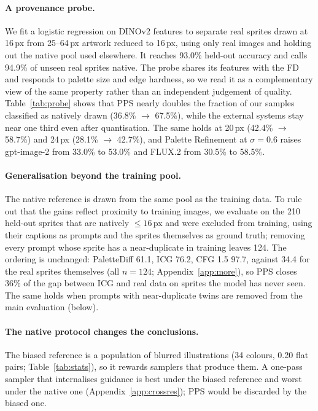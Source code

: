 \documentclass{article} %
\newcommand{\ours}{PaletteDiff}
\begin{document}
\paragraph{A provenance probe.}
We fit a logistic
regression on DINOv2 features to separate real sprites drawn at 16\,px from 25--64\,px artwork reduced to 16\,px, using
only real images and holding out the native pool used elsewhere. It reaches 93.0\% held-out accuracy and calls 94.9\% of
unseen real sprites native. The probe shares its features with the FD and responds to palette size and edge hardness,
so we read it as a complementary view of the same property rather than an independent judgement of quality.
Table~\ref{tab:probe} shows that PPS nearly doubles the fraction of our samples classified as natively drawn (36.8\%
$\to$ 67.5\%), while the external systems stay near one third even after quantisation. The same holds at 20\,px (42.4\% $\to$ 58.7\%) and 24\,px (28.1\% $\to$ 42.7\%), and
Palette Refinement at $\sigma=0.6$ raises gpt-image-2 from 33.0\% to 53.0\% and FLUX.2 from 30.5\% to 58.5\%.

\paragraph{Generalisation beyond the training pool.}
The native reference is drawn from the same pool as the training data. To rule out that the gains reflect proximity to
training images, we evaluate on the 210 held-out sprites that are natively $\le 16$\,px and were excluded from training,
using their captions as prompts and the sprites themselves as ground truth; removing every prompt whose sprite has a
near-duplicate in training leaves 124. The ordering is unchanged: \ours{} 61.1, ICG 76.2, CFG 1.5 97.7, against 34.4
for the real sprites themselves (all $n=124$; Appendix~\ref{app:more}), so PPS closes 36\% of the gap between ICG and
real data on sprites the model has never seen. The same holds when prompts with near-duplicate twins are removed from the main evaluation
(below).

\paragraph{The native protocol changes the conclusions.}
The biased reference is a population of blurred illustrations (34 colours, 0.20 flat pairs; Table~\ref{tab:stats}), so
it rewards samplers that produce them. A one-pass sampler that internalises guidance \citep{Chen2025gft} is best under
the biased reference and worst under the native one (Appendix~\ref{app:crossres}); PPS would be discarded by the biased
one.
\end{document}
